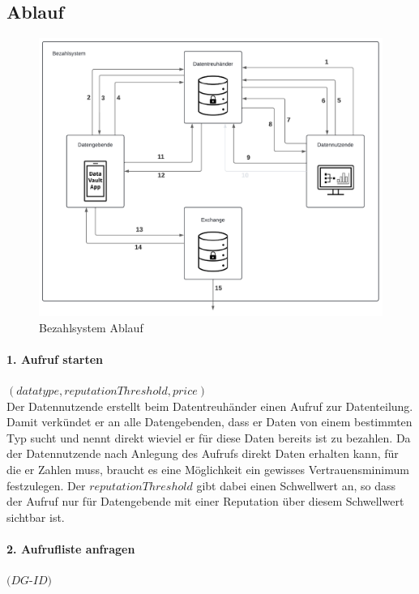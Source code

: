 \documentclass[11pt,a4paper]{scrreprt}
\begin{document}
\subsection{Ablauf}
\begin{figure}[H]
    \centering
    \includegraphics[width=0.9\linewidth]{PaymentDiagramm.pdf}
    \caption{Bezahlsystem Ablauf}
    \label{fig:payment}
\end{figure} 

\paragraph{1. Aufruf starten} $(datatype, reputationThreshold, price)$\\
Der Datennutzende erstellt beim Datentreuhänder einen Aufruf zur Datenteilung. Damit verkündet er an alle Datengebenden, dass er Daten von einem bestimmten Typ sucht und nennt direkt wieviel er für diese Daten bereits ist zu bezahlen. Da der Datennutzende nach Anlegung des Aufrufs direkt Daten erhalten kann, für die er Zahlen muss, braucht es eine Möglichkeit ein gewisses Vertrauensminimum festzulegen. Der $reputationThreshold$ gibt dabei einen Schwellwert an, so dass der Aufruf nur für Datengebende mit einer Reputation über diesem Schwellwert sichtbar ist.


\paragraph{2. Aufrufliste anfragen} $(DG$-$ID)$
\end{document}
